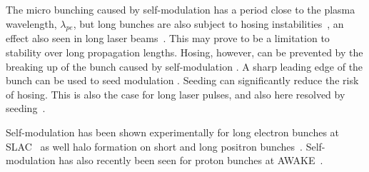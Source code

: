 The micro bunching caused by self-modulation has a period close to the plasma wavelength, $\lambda_{pe}$, but long bunches are also subject to hosing instabilities~\cite{whittum:1991}, an effect also seen in long laser beams~\cite{duda:1999,duda:2000}.
This may prove to be a limitation to stability over long propagation lengths.
Hosing, however, can be prevented by the breaking up of the bunch caused by self-modulation \cite{vieira:2014}.
A sharp leading edge of the bunch can be used to seed modulation \cite{fang:2014}.
Seeding can significantly reduce the risk of hosing.
This is also the case for long laser pulses, and also here resolved by seeding~\cite{vieira:2012}. 

Self-modulation has been shown experimentally for long electron bunches at SLAC~\cite{muggli:2014,muggli:2015} as well halo formation on short and long positron bunches~\cite{muggli:2008,hogan:2003}.
Self-modulation has also recently been seen for proton bunches at AWAKE~\cite{muggli:2017a}.

